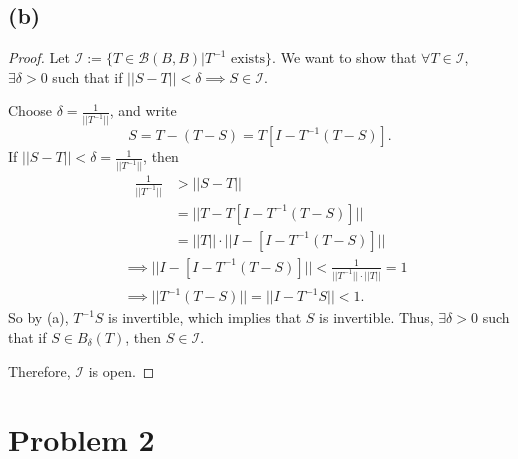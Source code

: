 \documentclass{article}
\begin{document}
\subsection*{(b)}
\begin{proof}
	Let $\mathcal{I} := \{T\in\mathcal{B}(B,B) | T^{-1} \textrm{ exists}\}$. We want to show that $\forall T\in\mathcal{I}$, $\exists \delta>0$ such that if $||S-T||<\delta \implies S\in\mathcal{I}$.
	
	Choose $\delta = \frac{1}{||T^{-1}||}$, and write 
	\begin{equation}
		S = T - (T-S) = T\left[I-T^{-1}\left(T-S\right)\right].
	\end{equation}
	If $||S-T||<\delta = \frac{1}{||T^{-1}||}$, then
	\begin{align}
		\frac{1}{||T^{-1}||} &> ||S-T|| \\
		&= ||T-T\left[I-T^{-1}(T-S)\right]|| \\
		&= ||T||\cdot||I-\left[I-T^{-1}(T-S)\right]||
	\end{align}
	\begin{align}
		&\implies ||I-\left[I-T^{-1}(T-S)\right]|| < \frac{1}{||T^{-1}||\cdot||T||} = 1 \\
		&\implies ||T^{-1}(T-S)|| = ||I-T^{-1}S|| < 1.
	\end{align}
	So by (a), $T^{-1}S$ is invertible, which implies that $S$ is invertible. Thus, $\exists \delta>0$ such that if $S\in B_{\delta}(T)$, then $S\in\mathcal{I}$.
	
	Therefore, $\mathcal{I}$ is open.
\end{proof}

\section*{Problem 2}
\end{document}
